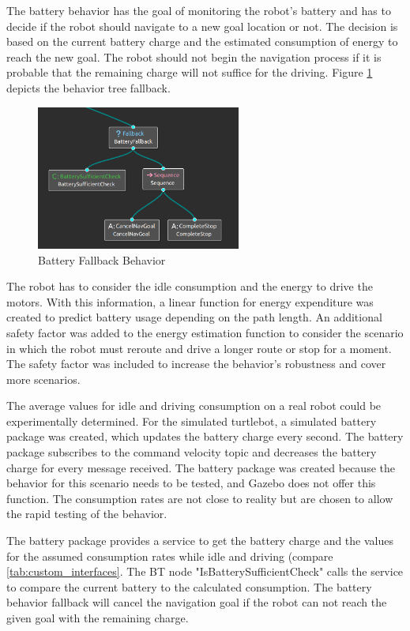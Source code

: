 The battery behavior has the goal of monitoring the robot's battery and has to decide if the robot should navigate to a new goal location or not. The decision is based on the current battery charge and the estimated consumption of energy to reach the new goal. The robot should not begin the navigation process if it is probable that the remaining charge will not suffice for the driving. Figure \ref{fig:battery_fallback} depicts the behavior tree fallback.

\begin{figure}[ht]
	\centering
	\includegraphics[width=0.6\textwidth]{images/battery_fallback.png}
	\caption{Battery Fallback Behavior}
	\label{fig:battery_fallback}
\end{figure}

The robot has to consider the idle consumption and the energy to drive the motors. With this information, a linear function for energy expenditure was created to predict battery usage depending on the path length. An additional safety factor was added to the energy estimation function to consider the scenario in which the robot must reroute and drive a longer route or stop for a moment. The safety factor was included to increase the behavior's robustness and cover more scenarios.
%

The average values for idle and driving consumption on a real robot could be experimentally determined. For the simulated turtlebot, a simulated battery package was created, which updates the battery charge every second. The battery package subscribes to the command velocity topic and decreases the battery charge for every message received. The battery package was created because the behavior for this scenario needs to be tested, and Gazebo does not offer this function. The consumption rates are not close to reality but are chosen to allow the rapid testing of the behavior.

The battery package provides a service to get the battery charge and the values for the assumed consumption rates while idle and driving (compare \ref{tab:custom_interfaces}. The BT node "IsBatterySufficientCheck" calls the service to compare the current battery to the calculated consumption. The battery behavior fallback will cancel the navigation goal if the robot can not reach the given goal with the remaining charge.

